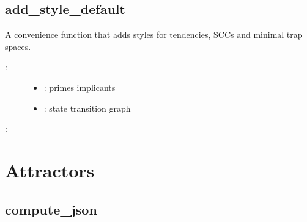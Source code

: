 \documentclass[letterpaper,10pt,english]{sphinxmanual}
\begin{document}
\subsection{add\_style\_default}
\label{\detokenize{StateTransitionGraphs:add-style-default}}\label{\detokenize{StateTransitionGraphs:stgs-add-style-default}}

\begin{fulllineitems}
\label{\detokenize{StateTransitionGraphs:PyBoolNet.StateTransitionGraphs.add_style_default}}
A convenience function that adds styles for tendencies, SCCs and minimal trap spaces.
\begin{description}
\item[{:}] \leavevmode\begin{itemize}
\item {} 
: primes implicants

\item {} 
: state transition graph

\end{itemize}

\end{description}

:

\begin{sphinxVerbatim}[commandchars=\\\{\}]
\end{sphinxVerbatim}

\end{fulllineitems}



\section{Attractors}
\label{\detokenize{Attractors:attractors}}\label{\detokenize{Attractors::doc}}\label{\detokenize{Attractors:id1}}

\subsection{compute\_json}
\label{\detokenize{Attractors:attractors-compute-json}}\label{\detokenize{Attractors:compute-json}}
\end{document}
